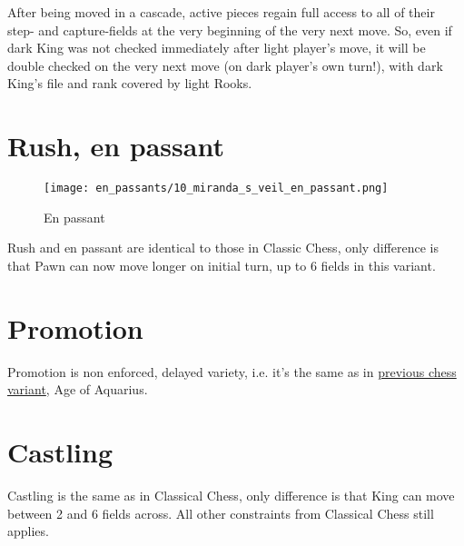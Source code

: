 After being moved in a cascade, active pieces regain full access to all of their step- and
capture-fields at the very beginning of the very next move. So, even if dark King was not
checked immediately after light player's move, it will be double checked on the very next
move (on dark player's own turn!), with dark King's file and rank covered by light Rooks.

\clearpage %

\section*{Rush, en passant}

\noindent
\begin{wrapfigure}[5]{l}{0.4\textwidth}
\centering
\texttt{[image: en\_passants/10\_miranda\_s\_veil\_en\_passant.png]}
\caption{En passant}
\label{fig:10_miranda_s_veil_en_passant}
\end{wrapfigure}
Rush and en passant are identical to those in Classic Chess, only difference
is that Pawn can now move longer on initial turn, up to 6 fields in this
variant.


\vspace*{9.0\baselineskip}
\section*{Promotion}

Promotion is non enforced, delayed variety, i.e. it's the same as in
\hyperref[sec:Age of Aquarius/Promotion]{previous chess variant}, Age of Aquarius.

\clearpage %

\section*{Castling}

Castling is the same as in Classical Chess, only difference is that King can move between 2 and 6 fields across.
All other constraints from Classical Chess still applies.

